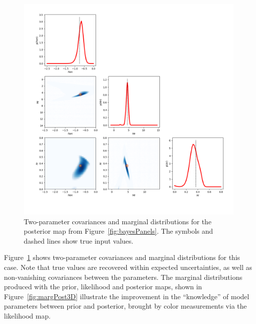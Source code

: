 \begin{figure}[t!]
  \includegraphics[width=1.0\textwidth,angle=0]{figures/cornerPlot3_ex1.png}
  \vskip -0.5in
\caption{Two-parameter covariances and marginal distributions for
  the posterior map from Figure~\ref{fig:bayesPanels}. The symbols and
  dashed lines show true input values.}
\label{fig:cornerPlot3ex1}
\end{figure}


Figure~\ref{fig:cornerPlot3ex1} shows two-parameter covariances and marginal distributions for this case.
Note that true values are recovered within expected uncertainties, as well as non-vanishing covariances
between the parameters. The marginal distributions produced with the prior, likelihood and posterior maps,
shown in
Figure~\ref{fig:margPost3D} illustrate the improvement in the ``knowledge'' of model
parameters between prior and posterior, brought by color measurements via the likelihood map. 




